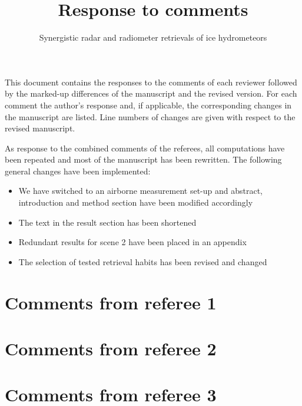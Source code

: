 \documentclass[11pt]{scrreprt}
\title{Response to comments}
\subtitle{Synergistic radar and radiometer retrievals of ice hydrometeors}
\date{}
\begin{document}
\maketitle

\setlength{\parindent}{0cm}

This document contains the responses to the comments of each reviewer followed
by the marked-up differences of the manuscript and the revised version. For each
comment the author's response and, if applicable, the corresponding changes in
the manuscript are listed. Line numbers of changes are given with respect to the
revised manuscript.

As response to the combined comments of the referees, all computations
have been repeated and most of the manuscript has been rewritten. The
following general changes have been implemented:

\begin{itemize}
\item We have switched to an airborne measurement set-up and
   abstract, introduction and method section have been modified accordingly
\item The text in the result section has been shortened
\item Redundant results for scene 2 have been placed in an appendix
\item The selection of tested retrieval habits has been revised and changed
\end{itemize}


\chapter{Comments from referee 1}

\chapter{Comments from referee 2}

\chapter{Comments from referee 3}





\end{document}
